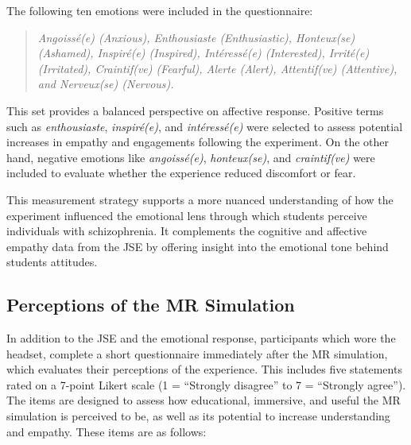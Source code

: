 The following ten emotions were included in the questionnaire:

\begin{quote}
\textit{Angoissé(e) (Anxious), Enthousiaste (Enthusiastic), Honteux(se) (Ashamed), Inspiré(e) (Inspired), Intéressé(e) (Interested), Irrité(e) (Irritated), Craintif(ve) (Fearful), Alerte (Alert), Attentif(ve) (Attentive), and Nerveux(se) (Nervous).}
\end{quote}

This set provides a balanced perspective on affective response. Positive terms such as \textit{enthousiaste}, \textit{inspiré(e)}, and \textit{intéressé(e)} were selected to assess potential increases in empathy and engagements following the experiment. On the other hand, negative emotions like \textit{angoissé(e)}, \textit{honteux(se)}, and \textit{craintif(ve)} were included to evaluate whether the experience reduced discomfort or fear.

\vspace{1em}

This measurement strategy supports a more nuanced understanding of how the experiment influenced the emotional lens through which students perceive individuals with schizophrenia. It complements the cognitive and affective empathy data from the JSE by offering insight into the emotional tone behind students attitudes.

\subsection{Perceptions of the MR Simulation}

In addition to the JSE and the emotional response, participants which wore the headset, complete a short questionnaire immediately after the MR simulation, which evaluates their perceptions of the experience. This includes five statements rated on a 7-point Likert scale (1 = “Strongly disagree” to 7 = “Strongly agree”). The items are designed to assess how educational, immersive, and useful the MR simulation is perceived to be, as well as its potential to increase understanding and empathy. These items are as follows:

